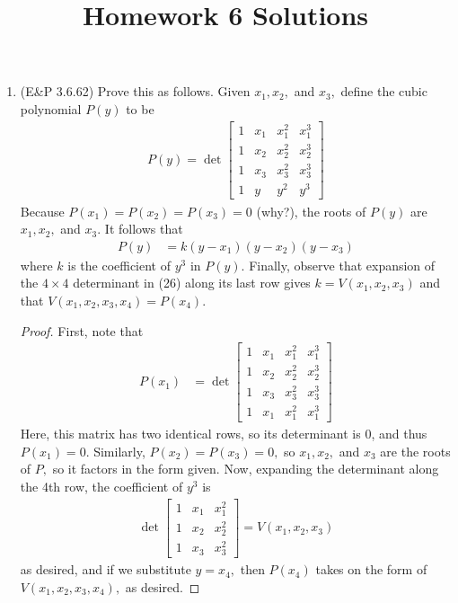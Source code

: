 \documentclass{article}
\begin{document}
\title{Homework 6 Solutions}
\maketitle
\thispagestyle{fancy}

\begin{enumerate}
	\item (E\&P 3.6.62) Prove this as follows. Given $x_1, x_2,$ and $x_3,$ define the cubic polynomial $P(y)$ to be
		\begin{align*}
			P(y) = \det\begin{bmatrix}
				1 & x_1 & x_1^2 & x_1^3 \\
				1 & x_2 & x_2^2 & x_2^3 \\
				1 & x_3 & x_3^2 & x_3^3 \\
				1 & y & y^2 & y^3
			\end{bmatrix} \tag{26}
		\end{align*}
		Because $P(x_1)=P(x_2)=P(x_3)=0$ (why?), the roots of $P(y)$ are $x_1, x_2,$ and $x_3.$ It follows that
		\begin{align*}
			P(y) &= k(y-x_1)(y-x_2)(y-x_3)
		\end{align*}
	where $k$ is the coefficient of $y^3$ in $P(y).$ Finally, observe that expansion of the $4\times 4$ determinant in (26) along its last row gives $k=V(x_1, x_2, x_3)$ and that $V(x_1, x_2, x_3, x_4) = P(x_4).$
	\begin{proof}
		First, note that
		\begin{align*}
			P(x_1) &= \det \begin{bmatrix}
				1 & x_1 & x_1^2 & x_1^3 \\
				1 & x_2 & x_2^2 & x_2^3 \\
				1 & x_3 & x_3^2 & x_3^3 \\
				1 & x_1& x_1^2 & x_1^3
			\end{bmatrix}
		\end{align*}
		Here, this matrix has two identical rows, so its determinant is 0, and thus $P(x_1)=0.$ Similarly, $P(x_2)=P(x_3)=0,$ so $x_1, x_2,$ and $x_3$ are the roots of $P,$ so it factors in the form given. Now, expanding the determinant along the 4th row, the coefficient of $y^3$ is
		\begin{align*}
			\det\begin{bmatrix}
				1 & x_1 & x_1^2 \\
				1 & x_2 & x_2^2 \\
				1 & x_3 & x_3^2
			\end{bmatrix} = V(x_1, x_2, x_3)
		\end{align*}
		as desired, and if we substitute $y=x_4,$ then $P(x_4)$ takes on the form of $V(x_1, x_2, x_3, x_4),$ as desired.
	\end{proof}


\end{enumerate}
\end{document}
